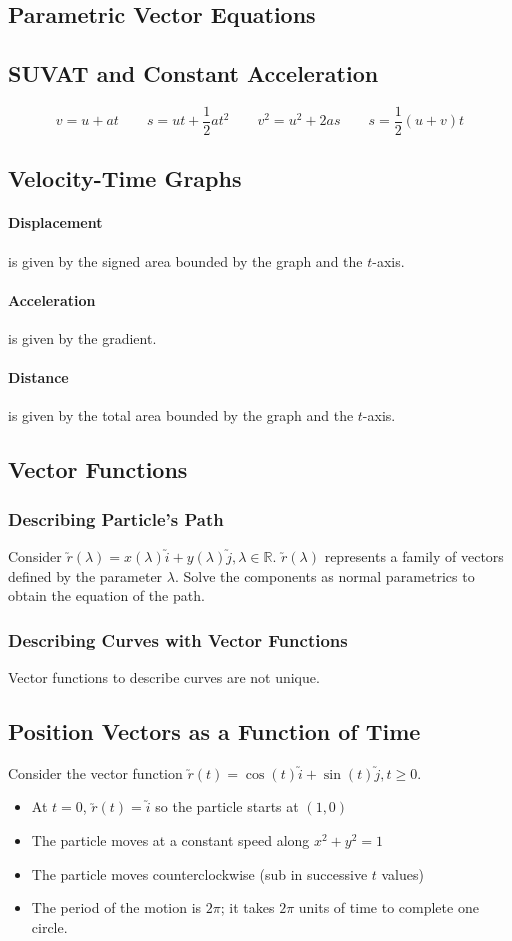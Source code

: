 \documentclass[a4paper,twoside]{article}
\begin{document}
		\subsection{Parametric Vector Equations}
			
		\subsection{SUVAT and Constant Acceleration}
			\[
				v=u+at \qquad s=ut+\frac{1}{2}at^2 \qquad v^2=u^2+2as \qquad s=\frac{1}{2}(u+v)t
			\]
		\subsection{Velocity-Time Graphs}
			\paragraph{Displacement} is given by the signed area bounded by the graph and the $t$-axis.
			\paragraph{Acceleration} is given by the gradient.
			\paragraph{Distance} is given by the total area bounded by the graph and the $t$-axis.
		\subsection{Vector Functions}
			\subsubsection{Describing Particle's Path}
				Consider $\utilde{r}(\lambda)=x(\lambda)\utilde{i}+y(\lambda)\utilde{j},\lambda\in\mathbb{R}$. $\utilde{r}(\lambda)$ represents a family of vectors defined by the parameter $\lambda$. Solve the components as normal parametrics to obtain the equation of the path.
			\subsubsection{Describing Curves with Vector Functions}
				Vector functions to describe curves are not unique.
		\subsection{Position Vectors as a Function of Time}
			Consider the vector function $\utilde{r}(t)=\cos(t)\utilde{i}+\sin(t)\utilde{j},t\geq0$.
			\begin{itemize}
				\item At $t=0$, $\utilde{r}(t)=\utilde{i}$ so the particle starts at $(1,0)$
				\item The particle moves at a constant speed along $x^2+y^2=1$
				\item The particle moves counterclockwise (sub in successive $t$ values)
				\item The period of the motion is $2\pi$; it takes $2\pi$ units of time to complete one circle.
			\end{itemize}
\end{document}

